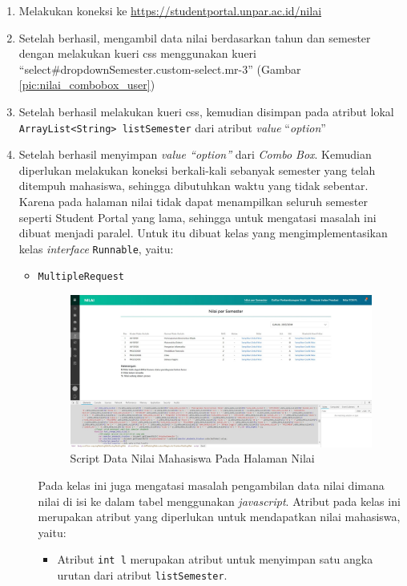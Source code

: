 \begin{enumerate}
	\item Melakukan koneksi ke \url{https://studentportal.unpar.ac.id/nilai}
	\item Setelah berhasil, mengambil data nilai berdasarkan tahun dan semester dengan melakukan kueri css menggunakan kueri ``select\#dropdownSemester.custom-select.mr-3'' (Gambar \ref{pic:nilai_combobox_user})
	\item Setelah berhasil melakukan kueri css, kemudian disimpan pada atribut lokal \texttt{ArrayList<String> listSemester} dari atribut \textit{value} ``\textit{option}''
	\item Setelah berhasil menyimpan \textit{value ``option''} dari \textit{Combo Box}. Kemudian diperlukan melakukan koneksi berkali-kali sebanyak semester yang telah ditempuh mahasiswa, sehingga dibutuhkan waktu yang tidak sebentar. Karena pada halaman nilai tidak dapat menampilkan seluruh semester seperti Student Portal yang lama, sehingga untuk mengatasi masalah ini dibuat menjadi paralel. Untuk itu dibuat kelas yang mengimplementasikan kelas \textit{interface} \texttt{Runnable}, yaitu:
	\begin{itemize}
		\item \texttt{MultipleRequest}
		\begin{figure}[H]
			\centering
			\includegraphics[scale=0.3]{Gambar/Nilai_per_semester_salah_satu}
			\caption{Script Data Nilai Mahasiswa Pada Halaman Nilai}
			\label{pic:nilai_per_semester_script}
		\end{figure}
		Pada kelas ini juga mengatasi masalah pengambilan data nilai dimana nilai di isi ke dalam tabel menggunakan \textit{javascript}. Atribut pada kelas ini merupakan atribut yang diperlukan untuk mendapatkan nilai mahasiswa, yaitu:
		\begin{itemize}
			\item Atribut \texttt{int l} merupakan atribut untuk menyimpan satu angka urutan dari atribut \texttt{listSemester}.

\end{itemize}
\end{itemize}
\end{enumerate}
